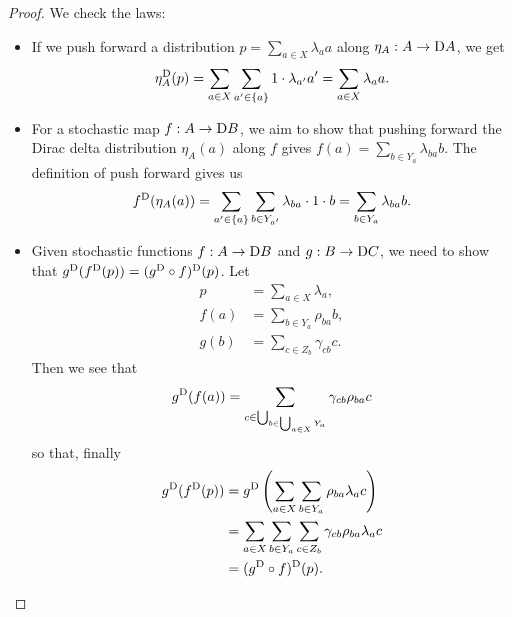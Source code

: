 \documentclass[DynamicalBook]{subfiles}
\begin{document}
\begin{proof}
  We check the laws:
  \begin{itemize}
  \item If we push forward a distribution $p = \sum_{a \in X}\lambda_a a$ along
    $\eta_A : A \to \mathrm{D} A$, we get
    \[
    \eta_A^{\mathrm{D}}(p) = \sum_{a \in X} \sum_{a' \in \{a\}} 1\cdot
    \lambda_{a'}  a' = \sum_{a \in X}\lambda_a a.
\]
  \item For a stochastic map $f : A \to \mathrm{D} B$, we aim to show that pushing
    forward the Dirac delta distribution $\eta_A(a)$ along $f$ gives $f(a) =
    \sum_{b \in Y_a} \lambda_{b a} b$. The definition of push forward gives us
    \[
f^{\mathrm{D}}(\eta_A(a)) = \sum_{a' \in \{a\}}\sum_{b \in Y_{a'}}
\lambda_{ba} \cdot 1 \cdot b = \sum_{b \in Y_a} \lambda_{ba} b.
    \]
   \item Given stochastic functions $f : A \to \mathrm{D} B$ and $g : B \to
     \mathrm{D} C$, we need to show that $g^{\mathrm{D}}(f^{\mathrm{D}}(p)) =
     (g^{\mathrm{D}}\circ f)^{\mathrm{D}}(p)$. Let
\begin{align*}
 p &= \sum_{a \in X} \lambda_{a}, \\
f(a) &= \sum_{b \in Y_a} \rho_{ba} b, \\
g(b) &= \sum_{c \in Z_b} \gamma_{cb} c.
\end{align*}
       Then we see that
       \[
g^{\mathrm{D}}(f(a)) = \sum_{c \in \bigcup_{b \in \bigcup_{a \in X} Y_a }} \gamma_{cb} \rho_{ba} c
       \]
       so that, finally
\begin{align*}
  g^{\mathrm{D}}(f^{\mathrm{D}}(p)) &= g^{\mathrm{D}}\left( \sum_{a \in X} \sum_{b \in Y_a} \rho_{ba} \lambda_a c \right) \\
                                &=  \sum_{a \in X} \sum_{b \in Y_a} \sum_{c \in Z_b} \gamma_{cb} \rho_{ba} \lambda_a c \\
  &= (g^{\mathrm{D}}\circ f)^{\mathrm{D}}(p). 
\end{align*}
  \end{itemize}


\end{proof}
\end{document}
